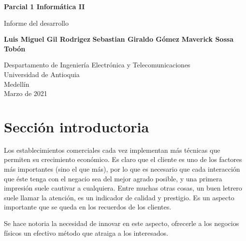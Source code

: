\documentclass{article}
\begin{document}
\begin{titlepage}
    \begin{center}
        \vspace*{1cm}
            
        \Huge
        \textbf{Parcial 1 Informática II}
            
        \vspace{0.5cm}
        \LARGE
        Informe del desarrollo
            
        \vspace{1.5cm}
            
        \textbf{Luis Miguel Gil Rodrigez}
        \newline
        \textbf{Sebastian Giraldo Gómez}
        \newline
        \textbf{Maverick Sossa Tobón}
        \newline
            
        \vfill
            
        \vspace{0.8cm}
            
        \Large
        Despartamento de Ingeniería Electrónica y Telecomunicaciones\\
        Universidad de Antioquia\\
        Medellín\\
        Marzo de 2021
            
    \end{center}
\end{titlepage}

\tableofcontents
\newpage
\section{Sección introductoria}\label{intro}
Los establecimientos comerciales cada vez implementan más técnicas que permiten su  crecimiento económico. Es claro que el cliente es uno de los factores más importantes (sino el que más), por lo que es necesario que cada interacción que éste tenga con el negacio sea del mejor agrado posible, y una primera impresión suele cautivar a cualquiera. Entre muchas otras cosas, un buen letrero suele llamar la atención, es un indicador de calidad y prestigio. Es un aspecto importante que se queda en los recuerdos de los clientes. 
\newline

Se hace notoria la necesidad de innovar en este aspecto, ofrecerle a los negocios físicos un efectivo método que atraiga a los interesados.  
\end{document}
